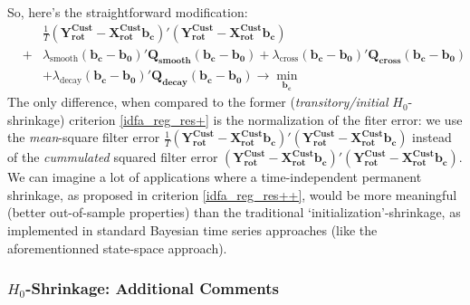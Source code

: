 \documentclass[11pt]{article}
\begin{document}
So, here's the straightforward modification:
\begin{eqnarray}\label{idfa_reg_res++}
&&\frac{1}{T}(\mathbf{Y_{\textrm{rot}}^{\textrm{Cust}}-X_{\textrm{rot}}^{\textrm{Cust}}b_c})'(\mathbf{Y_{\textrm{rot}}^{\textrm{Cust}}-X_{\textrm{rot}}^{\textrm{Cust}}b_c})\nonumber\\
&+&\lambda_{\textrm{smooth}}\mathbf{(b_c-b_0)'Q_{smooth}(b_c-b_0)}
+\lambda_{\textrm{cross}}\mathbf{(b_c-b_0)'Q_{cross}(b_c-b_0)}\nonumber\\
&&+\lambda_{\textrm{decay}}\mathbf{(b_c-b_0)'Q_{decay}(b_c-b_0)}\to\min_{\mathbf{b_c}}
\end{eqnarray}
The only difference, when compared to the former (\emph{transitory/initial} $H_0$-shrinkage) criterion \ref{idfa_reg_res+} is the normalization of the fiter error: we use the \emph{mean}-square filter error $\frac{1}{T}(\mathbf{Y_{\textrm{rot}}^{\textrm{Cust}}-X_{\textrm{rot}}^{\textrm{Cust}}b_c})'(\mathbf{Y_{\textrm{rot}}^{\textrm{Cust}}-X_{\textrm{rot}}^{\textrm{Cust}}b_c})$ instead of the \emph{cummulated} squared filter error $(\mathbf{Y_{\textrm{rot}}^{\textrm{Cust}}-X_{\textrm{rot}}^{\textrm{Cust}}b_c})'(\mathbf{Y_{\textrm{rot}}^{\textrm{Cust}}-X_{\textrm{rot}}^{\textrm{Cust}}b_c})$. \\

We can imagine a lot of applications where a time-independent permanent shrinkage, as proposed in criterion \ref{idfa_reg_res++},  would be more meaningful (better out-of-sample properties) than the traditional `initialization'-shrinkage, as implemented in standard Bayesian time series approaches (like the aforementionned state-space approach).


\subsubsection{$H_0$-Shrinkage: Additional  Comments}\label{h_0_addc}
\end{document}
